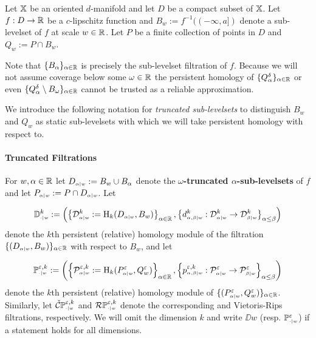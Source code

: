 
Let $\X$ be an oriented $d$-manifold and let $D$ be a compact subset of $\X$.
Let $f: D\to\R$ be a $c$-lipschitz function and $B_w := f^{-1}((-\infty,a])$ denote a sub-levelset of $f$ at scale $w\in\R$.
Let $P$ be a finite collection of points in $D$ and $Q_w := P\cap B_w$.

Note that $\{B_\alpha\}_{\alpha\in\R}$ is precisely the sub-levelset filtration of $f$.
Because we will not assume coverage below some $\omega\in\R$ the persistent homology of $\{Q_\alpha^\delta\}_{\alpha\in\R}$ or even $\{Q_\alpha^\delta\setminus B_\omega\}_{\alpha\in\R}$ cannot be trusted as a reliable approximation.

We introduce the following notation for \emph{truncated sub-levelsets} to distinguish $B_w$ and $Q_w$ as static sub-levelsets with which we will take persistent homology with respect to.

\paragraph{Truncated Filtrations}

For $w,\alpha\in\R$ let $D\subi{w}{\alpha} := B_w\cup B_\alpha$ denote the \textbf{$\omega$-truncated $\alpha$-sub-levelsets} of $f$ and let $P\subi{w}{\alpha} := P\cap D\subi{w}{\alpha}$.
%
Let %

\[ \DD{w}^k := \left(\left\{\D{w}{\alpha}^k := \hom_k(D\subi{w}{\alpha},B_w)\right\}_{\alpha\in\R},\left\{d\subi{w}{\alpha,\beta}^k : \D{w}{\alpha}^k\to\D{w}{\beta}^k\right\}_{\alpha\leq\beta}\right)\]
denote the $k$th persistent (relative) homology module of the filtration $\{(D\subi{w}{\alpha},B_w)\}_{\alpha\in\R}$ with respect to $B_w$, and let

\[\PP{w}{\e,k} := \left(\left\{\P{w}{\e,k}{\alpha} := \hom_k(P\subi{w}{\alpha}^\e,Q_w^\e)\right\}_{\alpha\in\R}, \left\{p\subi{w}{\alpha,\beta}^{\e,k} : \P{w}{\e}{\alpha}\to\P{w}{\e}{\beta}\right\}_{\alpha\leq\beta}\right)\]
denote the $k$th persistent (relative) homology module of $\{(P\subi{w}{\alpha}^\e,Q_w^\e)\}_{\alpha\in\R}$.
Similarly, let $\CPP{w}{\e,k}$ and $\RPP{w}{\e,k}$ denote the corresponding \Cech and Vietoris-Rips filtrations, respectively.
We will omit the dimension $k$ and write $\DD{w}$ (resp. $\PP{w}{\e}$) if a statement holds for all dimensions.

